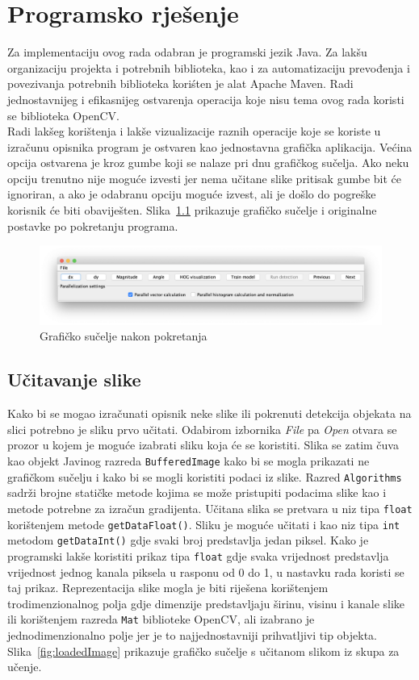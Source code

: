 \documentclass[times, utf8, zavrsni]{fer}
\begin{document}
\chapter{Programsko rješenje}
Za implementaciju ovog rada odabran je programski jezik Java. Za lakšu organizaciju projekta i potrebnih biblioteka, kao i za automatizaciju prevođenja i povezivanja potrebnih biblioteka koriśten je alat Apache Maven. Radi jednostavnijeg i efikasnijeg ostvarenja operacija koje nisu tema ovog rada koristi se biblioteka OpenCV. \\

Radi lakšeg korištenja i lakše vizualizacije raznih operacije koje se koriste u izračunu opisnika program je ostvaren kao jednostavna grafička aplikacija. Većina opcija ostvarena je kroz gumbe koji se nalaze pri dnu grafičkog sučelja. Ako neku opciju trenutno nije moguće izvesti jer nema učitane slike pritisak gumbe bit će ignoriran, a ako je odabranu opciju moguće izvest, ali je došlo do pogreške korisnik će biti obaviješten. Slika~\ref{fig:initialGui} prikazuje grafičko sučelje i originalne postavke po pokretanju programa.

\begin{figure}[htb]
	\centering
	\includegraphics[width=\linewidth]{figures/initialGui.png}
	\caption{Grafičko sučelje nakon pokretanja}
	\label{fig:initialGui}
\end{figure}

\section{Učitavanje slike}
Kako bi se mogao izračunati opisnik neke slike ili pokrenuti detekcija objekata na slici potrebno je sliku prvo učitati. Odabirom izbornika \textit{File} pa \textit{Open} otvara se prozor u kojem je moguće izabrati sliku koja će se koristiti. Slika se zatim čuva kao objekt Javinog razreda \verb|BufferedImage| kako bi se mogla prikazati ne grafičkom sučelju i kako bi se mogli koristiti podaci iz slike. Razred \verb|Algorithms| sadrži brojne statičke metode kojima se može pristupiti podacima slike kao i metode potrebne za izračun gradijenta. Učitana slika se pretvara u niz tipa \verb|float| korištenjem metode \verb|getDataFloat()|. Sliku je moguće učitati i kao niz tipa \verb|int| metodom \verb|getDataInt()| gdje svaki broj predstavlja jedan piksel. Kako je programski lakše koristiti prikaz tipa \verb|float| gdje svaka vrijednost predstavlja vrijednost jednog kanala piksela u rasponu od 0 do 1, u nastavku rada koristi se taj prikaz. Reprezentacija slike mogla je biti riješena korištenjem trodimenzionalnog polja gdje dimenzije predstavljaju širinu, visinu i kanale slike ili korištenjem razreda \verb|Mat| biblioteke OpenCV, ali izabrano je jednodimenzionalno polje jer je to najjednostavniji prihvatljivi tip objekta. Slika~\ref{fig:loadedImage} prikazuje grafičko sučelje s učitanom slikom iz skupa za učenje.
\end{document}
